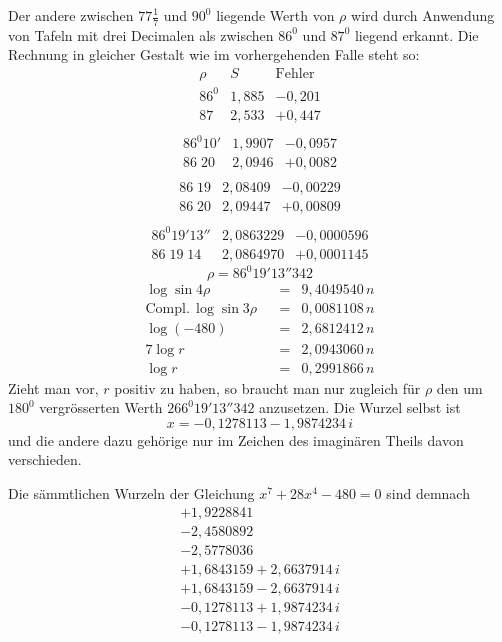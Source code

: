 Der andere zwischen $77\frac{1}{7}$ und $90^{0}$ liegende Werth von
$\rho$ wird durch Anwendung von Tafeln mit drei Decimalen als zwischen
$86^{0}$ und $87^{0}$ liegend erkannt. Die Rechnung in gleicher
Gestalt wie im vorhergehenden Falle steht so:
\[
\begin{array}{c|r|r}
\rho&S&\mathrm{Fehler}\\
86^{0}&1{,}885&-0{,}201\\
87&2{,}533&+0{,}447\\
\end{array}
\]
\[
\begin{array}{c|r|r}
86^{0}10'&1{,}9907&-0{,}0957\\
86\;20&2{,}0946&+0{,}0082\\
\end{array}
\]
\[
\begin{array}{c|r|r}
86\;19&2{,}08409&-0{,}00229\\
86\;20&2{,}09447&+0{,}00809\\
\end{array}
\]
\[
\begin{array}{c|r|r}
86^{0}19'13''&2{,}0863229&-0{,}0000596\\
86\;19\;14&2{,}0864970&+0{,}0001145
\end{array}
\]
\[
\rho=86^{0}19'13''342
\]
\[
\begin{array}{lrcl}
\log\sin4\rho&&=&9{,}4049540\,n\\
\mathrm{Compl.}\,\log\sin3\rho&&=&0{,}0081108\,n\\
\log(-480)&&=&2{,}6812412\,n\\\hline
7\log r&&=&2{,}0943060\,n\\
\log r&&=&0{,}2991866\,n
\end{array}
\]
Zieht man vor, $r$ positiv zu haben, so braucht man nur zugleich für
$\rho$ den um $180^{0}$ vergrösserten Werth
$266^{0}19'13''342$ anzusetzen. Die Wurzel selbst ist
\[
x=-0{,}1278113-1{,}9874234\,i
\]
und die andere dazu gehörige nur im Zeichen des imaginären Theils
davon verschieden.
\par{}
Die sämmtlichen Wurzeln der Gleichung $x^7+28x^4-480=0$ sind demnach
\[
\begin{array}{l}
+1{,}9228841\\
-2{,}4580892\\
-2{,}5778036\\
+1{,}6843159+2{,}6637914\,i\\
+1{,}6843159-2{,}6637914\,i\\
-0{,}1278113+1{,}9874234\,i\\
-0{,}1278113-1{,}9874234\,i
\end{array}
\]
